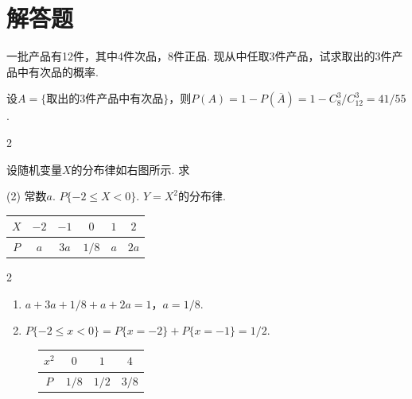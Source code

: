 \section{解答题}

\begin{problem}
    一批产品有12件，其中4件次品，8件正品. 现从中任取3件产品，试求取出的3件产品中有次品的概率.
\end{problem}
\begin{solution}
    设$A=\{\text{取出的3件产品中有次品}\}$，则$P(A)=1-P(\overline A)=1-C_8^3/C_{12}^3=41/55$.
\end{solution}

\begin{paracol}{2}
\begin{problem}
    设随机变量$X$的分布律如右图所示. 求
    \begin{tasks}[label=\arabic*.](2)
        \task 常数$a$.
        \task $P\{-2\leq X<0\}$.
        \task $Y=X^2$的分布律.
    \end{tasks}
\end{problem}
\switchcolumn
\vspace*{\fill}
\begin{table}[htbp]
    \centering
    \begin{tabular}{cccccc}
        \toprule
        $X$ & $-2$ & $-1$ & $0$ & $1$ & $2$\\
        \midrule
        $P$ & $a$ & $3a$ & $1/8$ & $a$ & $2a$\\
        \bottomrule
    \end{tabular}
\end{table}
\vspace{\fill}
\end{paracol}
\begin{paracol}{2}
\begin{solution}\leavevmode
    \begin{enumerate}
        \item $a+3a+1/8+a+2a=1$，$a=1/8$.
        \item $P\{-2\leq x<0\}=P\{x=-2\}+P\{x=-1\}=1/2$.
    \end{enumerate}
\switchcolumn
\vspace*{\fill}
\begin{figure}[htbp]
    \centering
    \begin{tabular}{cccc}
        \toprule
        $x^2$ & $0$ & $1$ & $4$\\
        \midrule
        $P$ & $1/8$ & $1/2$ & $3/8$\\
        \bottomrule
    \end{tabular}
\end{figure}
\end{solution}
\end{paracol}

